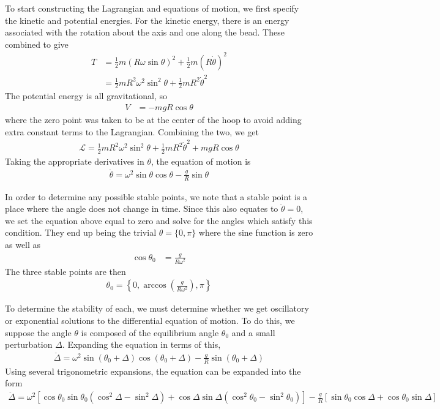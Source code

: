 To start constructing the Lagrangian and equations of motion, we first specify
the kinetic and potential energies. For the kinetic energy, there is an energy
associated with the rotation about the axis and one along the bead. These
combined to give
\begin{align*}
    T &= \frac 12 m (R{\omega}\sin \theta )^2 + \frac 12 m (R\dot \theta )^2 \\
    {} &= \frac 12 m R^2 {\omega}^2 \sin^2 \theta  + \frac 12 m R^2 {\dot \theta }^2
\end{align*}
The potential energy is all gravitational, so
\begin{align*}
    V &= -mgR\cos \theta 
\end{align*}
where the zero point was taken to be at the center of the hoop to avoid adding
extra constant terms to the Lagrangian. Combining the two, we get
\begin{align}
    \boxed{
    \mathcal L = \frac 12 mR^2{\omega}^2\sin^2 \theta  + \frac 12 mR^2{\dot \theta }^2 + mgR\cos \theta 
    }
\end{align}
Taking the appropriate derivatives in $\theta $, the equation of motion is
\begin{align}
    \boxed{
    \ddot \theta  = {\omega}^2 \sin \theta  \cos \theta  - \frac{g}{R}\sin \theta 
    }
\end{align}

In order to determine any possible stable points, we note that a stable point
is a place where the angle does not change in time. Since this also equates to
$\ddot \theta  = 0$, we set the equation above equal to zero and solve for the angles
which satisfy this condition. They end up being the trivial $\theta  = \{0, {\pi}\}$
where the sine function is zero as well as
\begin{align*}
    \cos \theta _0 &= \frac{g}{R{\omega}^2}
\end{align*}
The three stable points are then
\begin{align}
    \boxed{ \theta _0 = \left\{ 0, \arccos(\frac{g}{R{\omega}^2}), {\pi} \right\} }
\end{align}

To determine the stability of each, we must determine whether we get
oscillatory or exponential solutions to the differential equation of motion.
To do this, we suppose the angle $\theta $ is composed of the equilibrium angle
$\theta _0$ and a small perturbation $\Delta $. Expanding the equation in terms of this,
\begin{align*}
    \ddot \Delta  = {\omega}^2\sin(\theta _0+\Delta )\cos(\theta _0+\Delta ) - \frac{g}{R}\sin(\theta _0+\Delta )
\end{align*}
Using several trigonometric expansions, the equation can be expanded into the
form
\begin{align*}
    \ddot \Delta  = {\omega}^2\left[ \cos \theta _0\sin \theta _0 (\cos^2\Delta  - \sin^2\Delta ) + \cos \Delta \sin \Delta 
        (\cos^2\theta _0 - \sin^2\theta _0) \right] - \frac{g}{R}\left[ \sin \theta _0\cos \Delta  +
        \cos \theta _0\sin \Delta  \right]   
\end{align*}

